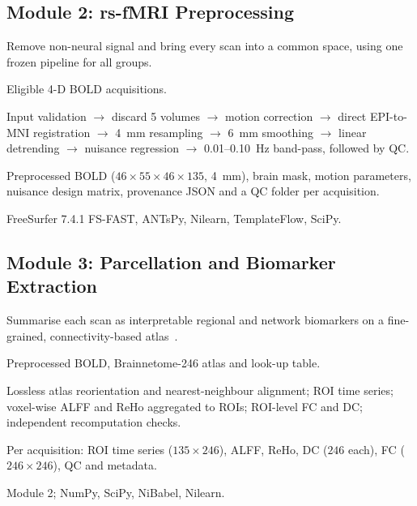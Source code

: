 \documentclass{ssnreview}
\begin{document}
\subsection{Module 2: rs-fMRI Preprocessing}
\begin{modulebox}\begin{description}[leftmargin=2.6cm, style=nextline, font=\normalfont\bfseries\color{SSNBlue}]
  \item[Purpose] Remove non-neural signal and bring every scan into a common
        space, using one frozen pipeline for all groups.
  \item[Inputs] Eligible 4-D BOLD acquisitions.
  \item[Processing] Input validation $\rightarrow$ discard 5 volumes
        $\rightarrow$ motion correction $\rightarrow$ direct EPI-to-MNI
        registration $\rightarrow$ 4~mm resampling $\rightarrow$ 6~mm
        smoothing $\rightarrow$ linear detrending $\rightarrow$ nuisance
        regression $\rightarrow$ 0.01--0.10~Hz band-pass, followed by QC.
  \item[Outputs] Preprocessed BOLD ($46\times55\times46\times135$, 4~mm),
        brain mask, motion parameters, nuisance design matrix, provenance JSON
        and a QC folder per acquisition.
  \item[Dependencies] FreeSurfer 7.4.1 FS-FAST, ANTsPy, Nilearn, TemplateFlow,
        SciPy.
\end{description}\end{modulebox}

\subsection{Module 3: Parcellation and Biomarker Extraction}
\begin{modulebox}\begin{description}[leftmargin=2.6cm, style=nextline, font=\normalfont\bfseries\color{SSNBlue}]
  \item[Purpose] Summarise each scan as interpretable regional and network
        biomarkers on a fine-grained, connectivity-based atlas~\cite{fan2016}.
  \item[Inputs] Preprocessed BOLD, Brainnetome-246 atlas and look-up table.
  \item[Processing] Lossless atlas reorientation and nearest-neighbour
        alignment; ROI time series; voxel-wise ALFF and ReHo aggregated to
        ROIs; ROI-level FC and DC; independent recomputation checks.
  \item[Outputs] Per acquisition: ROI time series ($135\times246$), ALFF,
        ReHo, DC ($246$ each), FC ($246\times246$), QC and metadata.
  \item[Dependencies] Module 2; NumPy, SciPy, NiBabel, Nilearn.
\end{description}\end{modulebox}
\end{document}
